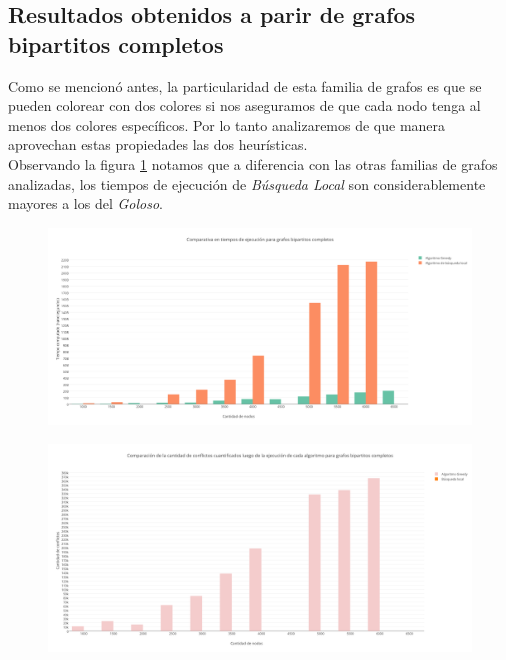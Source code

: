 \subsection {Resultados obtenidos a parir de grafos bipartitos completos}

Como se mencionó antes, la particularidad de esta familia de grafos es que se pueden colorear con dos colores si nos aseguramos de que cada nodo tenga al menos dos colores específicos. Por lo tanto analizaremos de que manera aprovechan estas propiedades las dos heurísticas.\\

Observando la figura \ref{TiemposGreedyBL} notamos que a diferencia con las otras familias de grafos analizadas, los tiempos de ejecución de \emph{Búsqueda Local} son considerablemente mayores a los del \emph{Goloso}.

\begin{figure}[H]
  \centering
  \includegraphics[width=18cm]{imagenes/Ej5/bipartitosCompletos/TiemposGreedyBL.png}
  \caption{}
    \label{TiemposGreedyBL}
\end{figure}

\begin{figure}[H]
  \centering
  \includegraphics[width=18cm]{imagenes/Ej5/bipartitosCompletos/ConflictosGreedyBL.png}
  \caption{}
    \label{ConflictosGreedyBL}
\end{figure}

